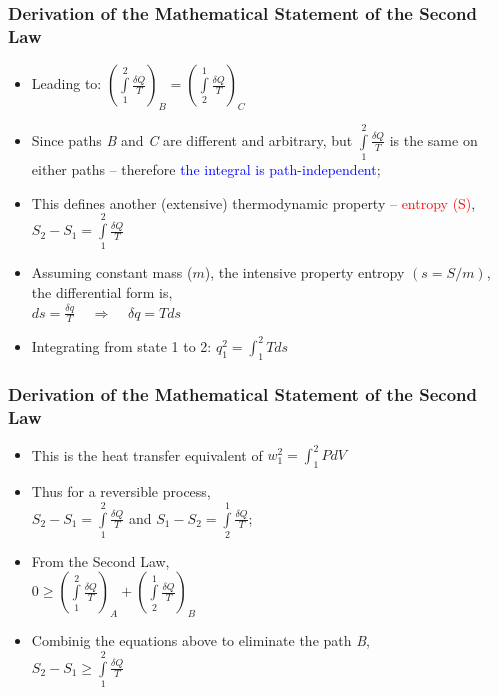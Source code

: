 \documentclass[10pt,compress,handout,ignorenonframetext]{beamer}
\begin{document}
\begin{frame}
 \frametitle{Derivation of the Mathematical Statement of the Second Law}
   \begin{itemize}
    \item <2-> Leading to:
          $\left( \displaystyle\int\limits_{1}^{2} \displaystyle\frac{\delta Q}{T} \right)_{B} = \left( \displaystyle\int\limits_{2}^{1} \displaystyle\frac{\delta Q}{T} \right)_{C} $
    \item <3-> Since paths {\it B} and {\it C} are different and arbitrary, but $\displaystyle\int\limits_{1}^{2}\displaystyle\frac{\delta Q}{T}$ is the same on either paths -- therefore \textcolor{blue}{the integral is path-independent};
    \item <4-> This defines another (extensive) thermodynamic property -- \textcolor{red}{entropy (S)}, \\
          $S_{2} - S_{1} = \displaystyle\int\limits_{1}^{2}\displaystyle\frac{\delta Q}{T}$
    \item <5-> Assuming constant mass ($m$), the intensive property entropy $\left(s=S/m\right)$, the differential form is, \\
          $ds = \displaystyle\frac{\delta q}{T} \;\;\;\; \Longrightarrow \;\;\;\; \delta q = Tds$
    \item <6-> Integrating from state 1 to 2: $q_{1}^{2} = \displaystyle\int_{1}^{2} Tds$    
   \end{itemize}
 \normalsize
\end{frame}


\begin{frame}
 \frametitle{Derivation of the Mathematical Statement of the Second Law}
   \begin{itemize}
  \item <1-> This is the heat transfer equivalent of $w_{1}^{2}=\displaystyle\int_{1}^{2}PdV$
  \item <2-> Thus for a reversible process, \\
       $S_{2} - S_{1} = \displaystyle\int\limits_{1}^{2}\displaystyle\frac{\delta Q}{T}$ and $S_{1} - S_{2} = \displaystyle\int\limits_{2}^{1}\displaystyle\frac{\delta Q}{T}$;
  \item <3-> From the Second Law, \\
       $0 \geq \left( \displaystyle\int\limits_{1}^{2}\displaystyle\frac{\delta Q}{T} \right)_{A} + \left( \displaystyle\int\limits_{2}^{1}\displaystyle\frac{\delta Q}{T} \right)_{B}$ 
  \item <4-> Combinig the equations above to eliminate the path {\it B}, \\
        $S_{2}-S_{1} \geq \displaystyle\int\limits_{1}^{2}\displaystyle\frac{\delta Q}{T}$
 \end{itemize}
 \normalsize
\end{frame}
\end{document}
